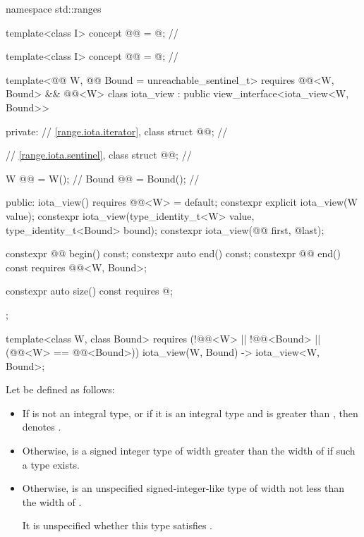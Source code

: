 %
\begin{codeblock}
namespace std::ranges {
  template<class I>
    concept @@ = @\seebelownc@;  // \expos

  template<class I>
    concept @@ = @\seebelownc@;    // \expos

  template<@@ W, @@ Bound = unreachable_sentinel_t>
    requires @@<W, Bound> && @@<W>
  class iota_view : public view_interface<iota_view<W, Bound>> {
  private:
    // \ref{range.iota.iterator}, class 
    struct @@;                    // \expos

    // \ref{range.iota.sentinel}, class 
    struct @@;                    // \expos

    W @@ = W();                     // \expos
    Bound @@ = Bound();             // \expos

  public:
    iota_view() requires @@<W> = default;
    constexpr explicit iota_view(W value);
    constexpr iota_view(type_identity_t<W> value, type_identity_t<Bound> bound);
    constexpr iota_view(@@ first, @\seebelow@ last);

    constexpr @@ begin() const;
    constexpr auto end() const;
    constexpr @@ end() const requires @@<W, Bound>;

    constexpr auto size() const requires @\seebelow@;
  };

  template<class W, class Bound>
    requires (!@@<W> || !@@<Bound> ||
              (@@<W> == @@<Bound>))
    iota_view(W, Bound) -> iota_view<W, Bound>;
}
\end{codeblock}

\pnum
Let  be defined as follows:
\begin{itemize}
\item
  If  is not an integral type, or
  if it is an integral type and 
  is greater than ,
  then  denotes .
\item
  Otherwise, 
  is a signed integer type of width greater than the width of 
  if such a type exists.
\item
  Otherwise, 
  is an unspecified signed-integer-like type
  of width not less than the width of .
  \begin{note}
  It is unspecified
  whether this type satisfies .
  \end{note}
\end{itemize}


